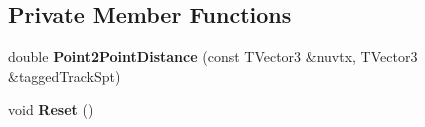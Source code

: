 \subsection*{Private Member Functions}
\begin{DoxyCompactItemize}
\item 
\hypertarget{classselection_1_1CRTApproachSelection_a4d3cc00b6333fbdd173aed916aadb9aa}{double {\bfseries Point2\-Point\-Distance} (const T\-Vector3 \&nuvtx, T\-Vector3 \&tagged\-Track\-Spt)}\label{classselection_1_1CRTApproachSelection_a4d3cc00b6333fbdd173aed916aadb9aa}

\item 
\hypertarget{classselection_1_1CRTApproachSelection_a6a2239444e404fa929032056dddedaa7}{void {\bfseries Reset} ()}\label{classselection_1_1CRTApproachSelection_a6a2239444e404fa929032056dddedaa7}

\end{DoxyCompactItemize}
